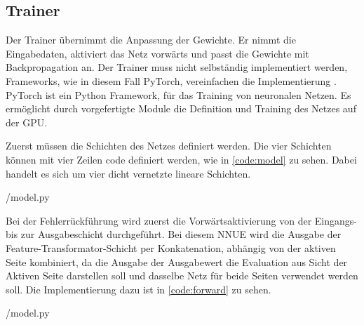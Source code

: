 \subsection{Trainer}
\label{chap:trainer}

Der Trainer übernimmt die Anpassung der Gewichte. Er nimmt die Eingabedaten, aktiviert das Netz vorwärts und passt die Gewichte mit Backpropagation an. Der Trainer muss nicht selbständig implementiert werden, Frameworks, wie in diesem Fall PyTorch, vereinfachen die Implementierung \cite{NEURIPS2019_9015}. PyTorch ist ein Python Framework, für das Training von neuronalen Netzen. Es ermöglicht durch vorgefertigte Module die Definition und Training des Netzes auf der GPU.

Zuerst müssen die Schichten des Netzes definiert werden. Die vier Schichten können mit vier Zeilen code definiert werden, wie in \autoref{code:model} zu sehen. Dabei handelt es sich um vier dicht vernetzte lineare Schichten.


{\srcloc/model.py}

Bei der Fehlerrückführung wird zuerst die Vorwärtsaktivierung von der Eingangs- bis zur Ausgabeschicht durchgeführt. Bei diesem \ac{NNUE} wird die Ausgabe der Feature-Transformator-Schicht per Konkatenation, abhängig von der aktiven Seite kombiniert, da die Ausgabe der Ausgabewert die Evaluation aus Sicht der Aktiven Seite darstellen soll und dasselbe Netz für beide Seiten verwendet werden soll. Die Implementierung dazu ist in \autoref{code:forward} zu sehen.


{\srcloc/model.py}

